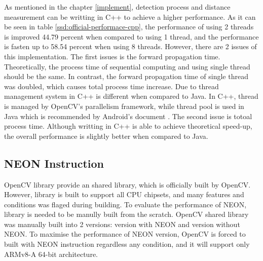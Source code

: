             As mentioned in the chapter \ref{implement},
            detection process and distance measurement can be writting in C++ to achieve a higher performance.
            As it can be seen in table \ref{ssd:official-performace-cpp},
            the performance of using 2 threads is improved 44.79 percent when compared to using 1 thread,
            and the performance is fasten up to 58.54 percent when using 8 threads.
            However, there are 2 issues of this implementation.
            The first issues is the forward propagation time.
                Theoretically, the process time of sequential computing and using single thread should be the same.
                In contrast, the forward propagation time of single thread was doubled,
                which causes total process time increase.
                Due to thread management system in C++ is different when compared to Java.
                In C++, thread is managed by OpenCV's parallelism framework, while
                thread pool is used in Java which is recommended by Android's document \cite{ANDROID-01}.
            The second issue is totoal process time.
                Although writting in C++ is able to achieve theoretical speed-up,
                the overall performance is slightly better when compared to Java.

        \subsection{NEON Instruction}
            OpenCV library provide an shared library, which is officially built by OpenCV.
            However, library is built to support all CPU chipsets, and many features and conditions was flaged during building.
            To evaluate the performance of NEON, library is needed to be manully built from the scratch.
            OpenCV shared library was manually built into 2 versions: version with NEON and version without NEON.
            To maximise the performance of NEON version, OpenCV is forced to built with NEON instruction regardless any condition,
            and it will support only ARMv8-A 64-bit architecture.

